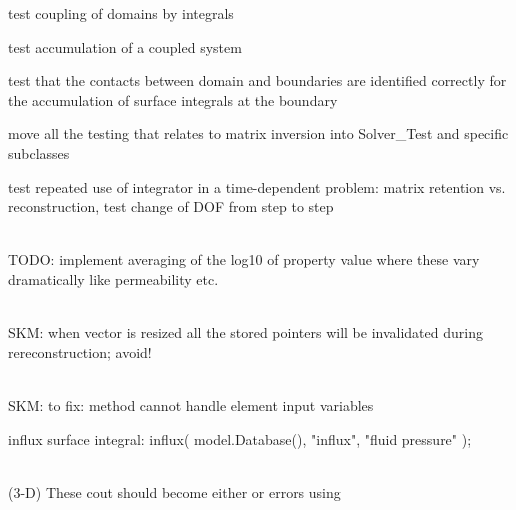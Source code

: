 \begin{DoxyRefList}
test coupling of domains by  integrals 



test accumulation of a coupled system 



test that the contacts between domain and boundaries are identified correctly for the accumulation of surface integrals at the boundary 



move all the testing that relates to matrix inversion into Solver\+\_\+\+Test and specific subclasses 



test repeated use of integrator in a time-\/dependent problem\+: matrix retention vs. reconstruction, test change of DOF from step to step 
\item[Member \doxylink{namespacecsmp_a879b22fcd55025a2e812db4ee6faddfa}{csmp\+::point\+Property\+Mapping} (const std\+::string \&model\+\_\+name)]\hfill \\
\label{todo__todo000191}%
%
TODO\+: implement averaging of the log10 of property value where these vary dramatically like permeability etc. 
\item[Member \doxylink{classcsmp_1_1_polygon_grid_manager_aad481de6e7f41323761afd0b7e53d98a}{csmp\+::Polygon\+Grid\+Manager\+::Add\+Node} (const \doxylink{classcsmp_1_1_point_3_013_u_01_4}{csmp\+::\+Point$<$ 3\+U $>$} \&)]\hfill \\
\label{todo__todo000124}%
%
SKM\+: when vector is resized all the stored pointers will be invalidated during rereconstruction; avoid!  
\item[Member \doxylink{classcsmp_1_1_pressure_diffusion___example_acedc50849e6a2394aa136182e8deb1e0}{csmp\+::Pressure\+Diffusion\+\_\+\+Example\+::Run} ()]\hfill \\
\label{todo__todo000047}%
%
SKM\+: to fix\+: method cannot handle element input variables 

\label{todo__todo000048}%
%
influx surface integral\+:  influx( model.\+Database(), "{}influx"{}, "{}fluid pressure"{} );  
\item[Member \doxylink{classcsmp_1_1_property_database_a50b012fcee349b7668d61132b6ac34ca}{csmp\+::Property\+Database\texorpdfstring{$<$}{<} dim \texorpdfstring{$>$}{>}\+::Add\+Property} ()]\hfill \\
\label{todo__todo000180}%
%
(3-\/D) These cout should become either  or errors using  




\end{DoxyRefList}
